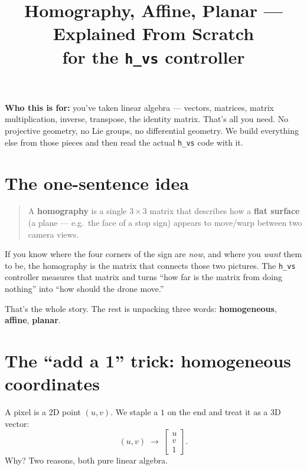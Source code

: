 \documentclass[11pt]{article}
\title{Homography, Affine, Planar --- Explained From Scratch\\[2pt]
\large for the \texttt{h\_vs} controller}
\author{}
\date{}
\begin{document}
\maketitle

\noindent\textbf{Who this is for:} you've taken linear algebra --- vectors,
matrices, matrix multiplication, inverse, transpose, the identity matrix.
That's all you need. No projective geometry, no Lie groups, no differential
geometry. We build everything else from those pieces and then read the actual
\texttt{h\_vs} code with it.

\section{The one-sentence idea}

\begin{quote}
A \textbf{homography} is a single $3\times3$ matrix that describes how a
\textbf{flat surface} (a plane --- e.g.\ the face of a stop sign) appears to
move/warp between two camera views.
\end{quote}

If you know where the four corners of the sign are \emph{now}, and where you
\emph{want} them to be, the homography is the matrix that connects those two
pictures. The \texttt{h\_vs} controller measures that matrix and turns ``how
far is the matrix from doing nothing'' into ``how should the drone move.''

That's the whole story. The rest is unpacking three words: \textbf{homogeneous},
\textbf{affine}, \textbf{planar}.

\section{The ``add a 1'' trick: homogeneous coordinates}

A pixel is a 2D point $(u,v)$. We staple a $1$ on the end and treat it as a 3D
vector:
\[
(u,v)\;\longrightarrow\;\begin{bmatrix} u\\ v\\ 1\end{bmatrix}.
\]
Why? Two reasons, both pure linear algebra.
\end{document}
